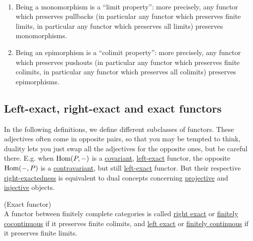 \begin{corollary}\label{cor:preserve_mono_epi}\phantom{}\\
\begin{enumerate}
\renewcommand{\labelenumi}{(\theenumi)}
\item Being a monomorphism is a “limit property”: more precisely, any functor which preserves pullbacks
(in particular any functor which preserves finite limits, in particular any functor which preserves all limits)
preserves monomorphisms.
\item Being an epimorphism is a “colimit property”: more precisely, any functor which preserves pushouts
(in particular any functor which preserves finite colimits, in particular any functor which preserves all colimits)
preserves epimorphisms.
\end{enumerate}
\end{corollary}

\subsection{Left-exact, right-exact and exact functors}

In the following definitions, we define different subclasses of functors. These adjectives often come in opposite pairs, so that you may be
tempted to think, duality lets you just swap all the adjectives for the opposite ones, but be careful there. E.g. when 
$\textup{Hom}(P,-)$ is a \ul{covariant}, \ul{left-exact} functor, the opposite $\textup{Hom}(-,P)$ is a \ul{contravariant}, but still \ul{left-exact} functor.
But their respective \ul{right-exactedness} is equivalent to dual concepts concerning \ul{projective} and \ul{injective} objects.

\begin{definition}{(Exact functor)}\label{def:exact_functor}\\
A functor between finitely complete categories is called \ul{right exact} or \ul{finitely cocontinuous} if it preserves  finite colimits,
and \ul{left exact} or \ul{finitely continuous} if it preserves finite limits.
\end{definition}

